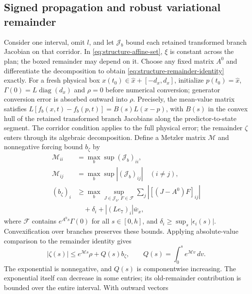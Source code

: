 \documentclass[journal,10pt]{IEEEtran}
\begin{document}
\subsection{Signed propagation and robust variational remainder}

Consider one interval, omit $l$, and let $\mathcal J_b$ bound each retained
transformed branch Jacobian on that corridor. In
\eqref{eq:structure-affine-set}, $\xi$ is constant across the plan;
the boxed remainder may depend on it. Choose any fixed matrix $A^0$ and
differentiate the decomposition to obtain
\eqref{eq:structure-remainder-identity} exactly. For a fresh physical box
$x(t_0)\in\widehat x+[-d_x,d_x]$, initialize $p(t_0)=\widehat x$,
$\Gamma(0)=L\operatorname{diag}(d_x)$ and $\rho=0$ before numerical
conversion; generator conversion error is absorbed outward into $\rho$.
Precisely, the mean-value matrix satisfies
$L[f_b(x,t)-f_b(p,t)]=B(s)L(x-p)$, with $B(s)$ in the convex hull of
the retained transformed branch Jacobians along the predictor-to-state
segment. The corridor condition applies to the full physical error; the
remainder $\zeta$ enters through its algebraic decomposition.
Define a Metzler matrix
$\mathcal M$ and nonnegative forcing bound $b_\zeta$ by
\begin{equation}
 \begin{aligned}
 \mathcal M_{ii}&=\max_b\sup(\mathcal J_b)_{ii},\\
 \mathcal M_{ij}&=\max_b\sup|(\mathcal J_b)_{ij}|\quad(i\ne j),\\
 (b_\zeta)_i&\ge\max_b\sup_{J\in\mathcal J_b,\,F\in\mathcal F}
                  \sum_j|[(J-A^0)F]_{ij}|\\
             &\hspace{1em}+\delta_i+|(Le_7)_i|\bar w_x,
 \end{aligned}
 \label{eq:structure-metzler}
\end{equation}
where $\mathcal F$ contains $e^{A^0s}\Gamma(0)$ for all $s\in[0,h]$,
and $\delta_i\ge\sup_s|\epsilon_i(s)|$. Convexification over branches
preserves these bounds. Applying absolute-value comparison to the remainder
identity gives
\begin{equation}
 |\zeta(s)|\le e^{\mathcal Ms}\rho+Q(s)b_\zeta,
 \qquad Q(s)=\int_0^s e^{\mathcal Mv}\,dv.
 \label{eq:structure-remainder-bound}
\end{equation}
The exponential is nonnegative, and $Q(s)$ is componentwise increasing.
The exponential itself can decrease in some entries; its old-remainder
contribution is bounded over the entire interval. With outward vectors
\end{document}
